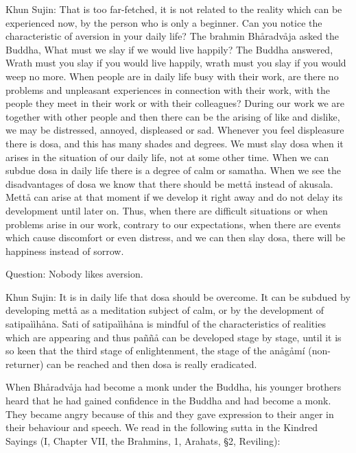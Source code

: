 \documentclass[12pt,twoside]{article}
\begin{document}
Khun Sujin: That is too far{}-fetched, it is not related to the reality
which can be experienced now, by the person who is only a beginner. Can
you notice the characteristic of aversion in your daily life? The
brahmin Bh{\aa}radv{\aa}ja asked the Buddha,
{\textquotesingle}{\textquotesingle}What must we slay if we would live
happily?{\textquotesingle}{\textquotesingle} The Buddha answered,
{\textasciigrave}{\textasciigrave}Wrath must you slay if you would live
happily, wrath must you slay if you would weep no
more{\textquotesingle}{\textquotesingle}. When people are in daily life
busy with their work, are there no problems and unpleasant experiences
in connection with their work, with the people they meet in their work
or with their colleagues? During our work we are together with other
people and then there can be the arising of like and dislike, we may be
distressed, annoyed, displeased or sad. Whenever you feel displeasure
there is dosa, and this has many shades and degrees. We must slay dosa
when it arises in the situation of our daily life, not at some other
time. When we can subdue dosa in daily life there is a degree of calm
or samatha. When we see the disadvantages of dosa we know that there
should be mett{\aa} instead of akusala. Mett{\aa} can arise at that
moment if we develop it right away and do not delay its development
until later on. Thus, when there are difficult situations or when
problems arise in our work, contrary to our expectations, when there
are events which cause discomfort or even distress, and we can then
slay dosa, there will be happiness instead of sorrow. 

Question: Nobody likes aversion. 

Khun Sujin: It is in daily life that dosa should be overcome. It can be
subdued by developing mett{\aa} as a meditation subject of calm, or by
the development of satipa\`i\`ih{\aa}na. Sati of satipa\`i\`ih{\aa}na
is mindful of the characteristics of realities which are appearing and
thus pa\~n\~n{\aa} can be developed stage by stage, until it is so keen
that the third stage of enlightenment, the stage of the
an{\aa}g{\aa}m\'i (non{}-returner) can be reached and then dosa is
really eradicated. 

When Bh{\aa}radv{\aa}ja had become a monk under the Buddha, his younger
brothers heard that he had gained confidence in the Buddha and had
become a monk. They became angry because of this and they gave
expression to their anger in their behaviour and speech. We read in the
following sutta in the Kindred Sayings (I, Chapter VII, the Brahmins,
1, Arahats, {\S}2, Reviling):
\end{document}

